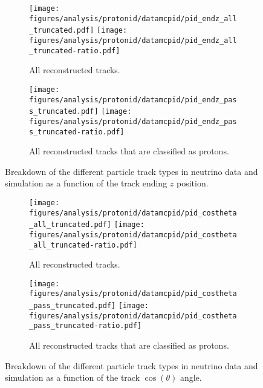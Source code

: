     \begin{figure}[h]
      \centering
      \begin{subfigure}[t]{2.8in}
        \texttt{[image: figures/analysis/protonid/datamcpid/pid\_endz\_all\_truncated.pdf]}
        \texttt{[image: figures/analysis/protonid/datamcpid/pid\_endz\_all\_truncated-ratio.pdf]}
        \caption{All reconstructed tracks.}
      \end{subfigure}
      \hspace{2pt}
      \begin{subfigure}[t]{2.8in}
        \texttt{[image: figures/analysis/protonid/datamcpid/pid\_endz\_pass\_truncated.pdf]}
        \texttt{[image: figures/analysis/protonid/datamcpid/pid\_endz\_pass\_truncated-ratio.pdf]}
        \caption{All reconstructed tracks that are classified as protons.}
      \end{subfigure}
      \caption{Breakdown of the different particle track types in neutrino data
      and simulation as a function of the track ending $z$ position.}
      \label{fig:pidendz}
    \end{figure}
    \begin{figure}[h]
      \centering
      \begin{subfigure}[t]{2.8in}
        \texttt{[image: figures/analysis/protonid/datamcpid/pid\_costheta\_all\_truncated.pdf]}
        \texttt{[image: figures/analysis/protonid/datamcpid/pid\_costheta\_all\_truncated-ratio.pdf]}
        \caption{All reconstructed tracks.}
      \end{subfigure}
      \hspace{2pt}
      \begin{subfigure}[t]{2.8in}
        \texttt{[image: figures/analysis/protonid/datamcpid/pid\_costheta\_pass\_truncated.pdf]}
        \texttt{[image: figures/analysis/protonid/datamcpid/pid\_costheta\_pass\_truncated-ratio.pdf]}
        \caption{All reconstructed tracks that are classified as protons.}
      \end{subfigure}
      \caption{Breakdown of the different particle track types in neutrino data
      and simulation as a function of the track $\cos(\theta)$ angle.}
      \label{fig:pidcostheta}
    \end{figure}
